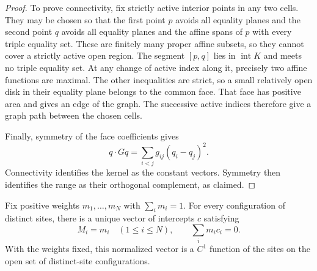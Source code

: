 \begin{proof}
To prove connectivity, fix strictly active interior points in any two
cells. They may be chosen so that the first point $p$ avoids all equality
planes and the second point $q$ avoids all equality planes and the affine
spans of $p$ with every triple equality set. These are finitely many
proper affine subsets, so they cannot cover a strictly active open
region. The segment $[p,q]$ lies in $\operatorname{int}K$ and meets no
triple equality set. At any change of active index along it, precisely
two affine functions are maximal. The other inequalities are strict,
so a small relatively open disk in their equality plane belongs to the
common face. That face has positive area and gives an edge of the graph.
The successive active indices therefore give a graph path between the
chosen cells.

Finally, symmetry of the face coefficients gives
\[
 q\cdot Gq=\sum_{i<j}g_{ij}(q_i-q_j)^2.
\]
Connectivity identifies the kernel as the constant vectors. Symmetry
then identifies the range as their orthogonal complement, as claimed.
\end{proof}

\begin{proposition}
\label{cells:weights}
Fix positive weights $m_1,\ldots,m_N$ with $\sum_i m_i=1$. For every
configuration of distinct sites, there is a unique vector of intercepts
$c$ satisfying
\begin{equation}
\label{cells:prescribed-masses}
 M_i=m_i\quad(1\le i\le N),\qquad \sum_i m_i c_i=0.
\end{equation}
With the weights fixed, this normalized vector is a $C^1$ function of
the sites on the open set of distinct-site configurations.
\end{proposition}

